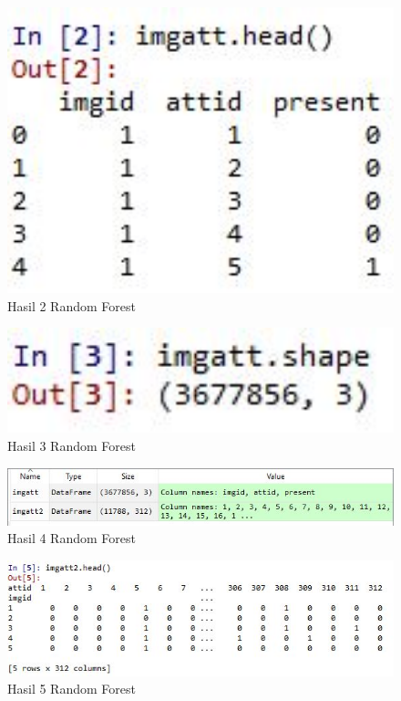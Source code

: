 \begin{figure}[ht]
	\centerline{\includegraphics[width=1\textwidth]{figures/huda/chapter3_praktek/5.JPG}}
	\caption{Hasil 2 Random Forest}
	\label{h9}
\end{figure}

\begin{figure}[ht]
	\centerline{\includegraphics[width=1\textwidth]{figures/huda/chapter3_praktek/6.JPG}}
	\caption{Hasil 3 Random Forest}
	\label{h10}
\end{figure}

\begin{figure}[ht]
	\centerline{\includegraphics[width=1\textwidth]{figures/huda/chapter3_praktek/7.JPG}}
	\caption{Hasil 4 Random Forest}
	\label{h11}
\end{figure}

\begin{figure}[ht]
	\centerline{\includegraphics[width=1\textwidth]{figures/huda/chapter3_praktek/8.JPG}}
	\caption{Hasil 5 Random Forest}
	\label{h12}
\end{figure}

